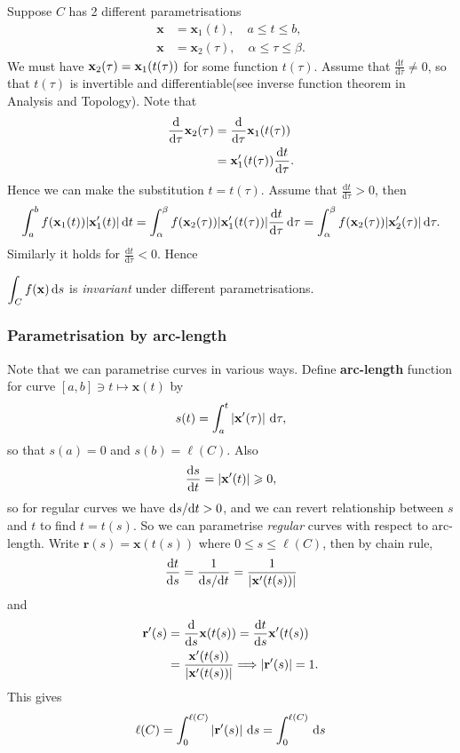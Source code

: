 Suppose $C$ has 2 different parametrisations
\begin{align*}
    \mathbf{x} &= \mathbf{x}_1(t), \quad a\le t\le b,\\
    \mathbf{x} &= \mathbf{x}_2(\tau),\quad \alpha\le \tau\le \beta.
\end{align*}
We must have $ {\bf x}_2(\tau) = {\bf x}_1(t(\tau)) $ for some function $t(\tau)$. Assume that $ \frac{\mathrm{d}t}{\mathrm{d}\tau}\neq 0  $, so that $ t(\tau) $ is invertible and differentiable(see inverse function theorem in Analysis and Topology). Note that 
\begin{align*}
    \frac{\mathrm{d}}{\mathrm{d}\tau} \mathbf{x}_2(\tau) &= \frac{\mathrm{d}}{\mathrm{d}\tau} \mathbf{x}_1(t(\tau))\\
    &= {\bf x}_1'(t(\tau)) \frac{\mathrm{d}t}{\mathrm{d}\tau}.  
\end{align*}
Hence we can make the substitution $ t=t(\tau) $. Assume that $ \frac{\mathrm{d}t}{\mathrm{d}\tau}>0  $, then 
\[
    \int_{a}^{b} f({\bf x}_1(t)) |\mathbf{x}_1'(t)| \,\mathrm{d}t = \int_{\alpha}^{\beta} f({\bf x}_2(\tau))|\mathbf{x}_1'(t(\tau))| \frac{\mathrm{d}t}{\mathrm{d}\tau}  \,\mathrm{d}\tau = \int_{\alpha}^{\beta} f({\bf x}_2(\tau))|\mathbf{x}_2'(\tau)| \,\mathrm{d}\tau.
\]
Similarly it holds for $ \frac{\mathrm{d}t}{\mathrm{d}\tau}<0  $. Hence
\begin{proposition}\label{prop:change of parametrisations}
    $ \displaystyle \int_{C} f({\bf x}) \,\mathrm{d}s $ is \textit{invariant} under different parametrisations.
\end{proposition}

\subsubsection*{Parametrisation by arc-length}
Note that we can parametrise curves in various ways. Define \textbf{arc-length} function for curve $ [a,b]\ni t \mapsto \mathbf{x}(t) $ by 
\[
    s(t) = \int_{a}^{t} \left| {\bf x}'(\tau) \right| \,\mathrm{d}\tau,
\]
so that $s(a)=0$ and $ s(b)=\ell (C) $. Also 
\[
    \frac{\mathrm{d}s}{\mathrm{d}t} = \left| {\bf x}'(t) \right| \geqslant 0, 
\]
so for regular curves we have $ \mathrm{d} s/\mathrm{d} t >0 $, and we can revert relationship between $s$ and $t$ to find $t=t(s)$. So we can parametrise \textit{regular} curves with respect to arc-length. Write $ \mathbf{r}(s)=\mathbf{x}(t(s)) $ where $ 0\le s\le \ell (C) $, then by chain rule, 
\[
    \frac{\mathrm{d}t}{\mathrm{d}s} = \frac{1}{\mathrm{d} s/\mathrm{d} t} = \frac{1}{\left| \mathbf{x}'(t(s)) \right| }
\]
and 
\begin{align*}
    \mathbf{r}'(s)&= \frac{\mathrm{d}}{\mathrm{d}s}\mathbf{x}(t(s))=\frac{\mathrm{d}t}{\mathrm{d}s}\mathbf{x}'(t(s))\\ 
    &= \frac{\mathbf{x}'(t(s))}{\left| \mathbf{x}'(t(s)) \right|} \Longrightarrow \left| {\bf r}'(s) \right| =1. \\ 
\end{align*}
This gives 
\[
    \ell (C) = \int_{0}^{\ell (C)} \left| {\bf r}'(s) \right| \,\mathrm{d}s = \int_{0}^{\ell (C)} \,\mathrm{d}s
\]

